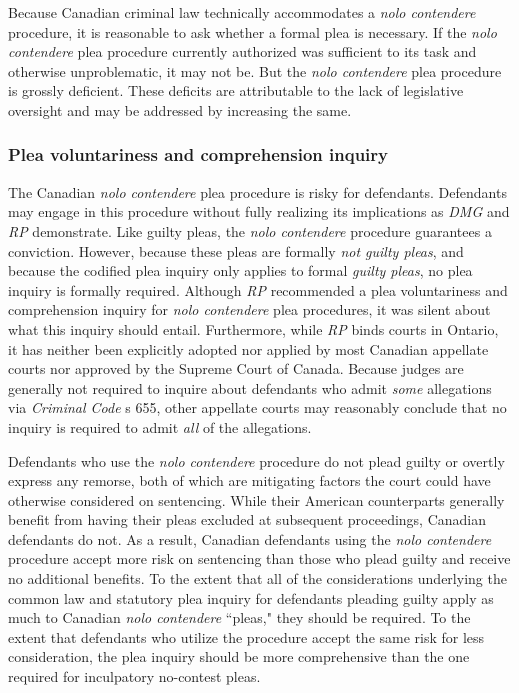 Because Canadian criminal law technically accommodates a \textit{nolo contendere} procedure, it is reasonable to ask whether a formal plea is necessary. If the \textit{nolo contendere} plea procedure currently authorized was sufficient to its task and otherwise unproblematic, it may not be. But the \textit{nolo contendere} plea procedure is grossly deficient. These deficits are attributable to the lack of legislative oversight and may be addressed by increasing the same.

\subsubsection{Plea voluntariness and comprehension inquiry}

The Canadian \textit{nolo contendere} plea procedure is risky for defendants. Defendants may engage in this procedure without fully realizing its implications as \textit{DMG} and \textit{RP} demonstrate. Like guilty pleas, the \textit{nolo contendere} procedure guarantees a conviction. However, because these pleas are formally \textit{not guilty pleas}, and because the codified plea inquiry only applies to formal \textit{guilty pleas}, no plea inquiry is formally required. Although \textit{RP} recommended a plea voluntariness and comprehension inquiry for \textit{nolo contendere} plea procedures, it was silent about what this inquiry should entail. Furthermore, while \textit{RP} binds courts in Ontario, it has neither been explicitly adopted nor applied by most Canadian appellate courts nor approved by the Supreme Court of Canada. Because judges are generally not required to inquire about defendants who admit \textit{some} allegations via \textit{Criminal Code} s 655, other appellate courts may reasonably conclude that no inquiry is required to admit \textit{all} of the allegations. 

Defendants who use the \textit{nolo contendere} procedure do not plead guilty or overtly express any remorse, both of which are mitigating factors the court could have otherwise considered on sentencing. While their American counterparts generally benefit from having their pleas excluded at subsequent proceedings, Canadian defendants do not. As a result, Canadian defendants using the \textit{nolo contendere} procedure accept more risk on sentencing than those who plead guilty and receive no additional benefits. To the extent that all of the considerations underlying the common law and statutory plea inquiry for defendants pleading guilty apply as much to Canadian \textit{nolo contendere} ``pleas," they should be required. To the extent that defendants who utilize the procedure accept the same risk for less consideration, the plea inquiry should be more comprehensive than the one required for inculpatory no-contest pleas.

